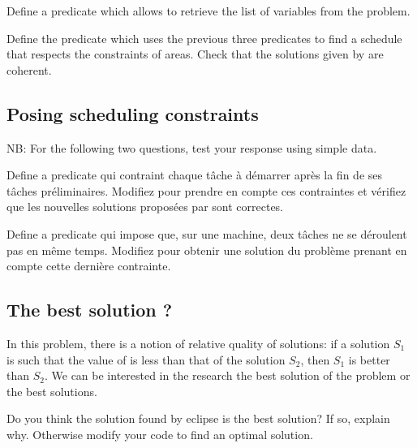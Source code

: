 \begin{question}
Define a predicate  which allows to retrieve the list of variables from the problem.
\end{question}

\begin{question}
Define the predicate  which uses the previous three predicates to find a schedule that respects the constraints of areas. Check that the solutions given by \eclipse{} are coherent.   
\end{question}

\subsection{Posing scheduling constraints}

NB: For the following two questions, test your
response using simple data.

\begin{question}
Define a predicate  qui contraint chaque tâche à démarrer après la fin de ses
tâches préliminaires. Modifiez  pour prendre en compte ces contraintes et vérifiez que les nouvelles solutions proposées par \eclipse{} sont correctes.
\end{question}

\begin{question} \label{TP2_Q4}
Define a predicate qui impose que, sur une machine, deux tâches ne se déroulent
pas en même temps. Modifiez  pour obtenir une solution du problème prenant en compte cette dernière contrainte.
\end{question}

\subsection{The best solution ?}

In this problem, there is a notion of relative quality of
solutions: if a solution $S_1$ is such that the value of
 is less than that of the solution $S_2$, then $S_1$
is better than $S_2$.  We can be interested in the research
the best solution of the problem or the best
solutions.
\begin{question} \label{TP2_last}
 Do you think the solution found by eclipse is the best solution? If so, explain why. Otherwise modify your code to find an optimal solution.
\end{question}


